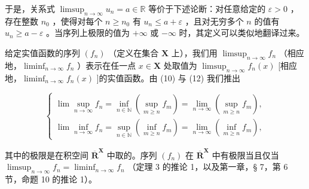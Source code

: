 于是，关系式 \(\limsup_{n\to \infty}u_n = a\in \mathbb{R}\) 等价于下述论断：对任意给定的 \(\varepsilon >0\) ，存在整数 \(n_0\) ，使得对每个 \(n\geqslant n_0\) 有 \(u_{n}\leqslant a + \varepsilon\) ，且对无穷多个 \(n\) 的值有 \(u_{n}\geqslant a - \varepsilon\) 。当序列上极限的值为 \(+\infty\) 或 \(-\infty\) 时，其定义可以类似地翻译过来。

给定实值函数的序列 \((f_n)\) （定义在集合 \(\mathbf{X}\) 上），我们用 \(\limsup_{n\to \infty}f_n\) （相应地，\(\liminf_{n\to \infty} f_n\) ）表示在任一点 \(x\in \mathbf{X}\) 处取值为 \(\limsup_{n\to \infty}f_n(x)\) {[}相应地，\(\liminf_{n\to \infty} f_n(x)\) {]}的实值函数。由 (10) 与 (12) 我们推出

\[
\left\{\begin{array}{l}\lim \sup _ {n \rightarrow \infty} f _ {n} = \inf _ {n \in \mathbb {N}} (\sup _ {m \geqslant n} f _ {m}) = \lim _ {n \rightarrow \infty} (\sup _ {m \geqslant n} f _ {m}),\\\lim \inf _ {n \rightarrow \infty} f _ {n} = \sup _ {n \in \mathbb {N}} (\inf _ {m \geqslant n} f _ {m}) = \lim _ {n \rightarrow \infty} (\inf _ {m \geqslant n} f _ {m}),\end{array}\right.\tag{16}
\]

其中的极限是在积空间 \(\overline{\mathbf{R}}^{\mathbf{X}}\) 中取的。序列 \((f_n)\) 在 \(\overline{\mathbf{R}}^{\mathbf{X}}\) 中有极限当且仅当 \(\limsup_{n\to\infty}f_n=\liminf_{n\to\infty}f_n\) （定理 3 的推论 1，以及第一章，§ 7，第 6 节，命题 10 的推论 1）。

